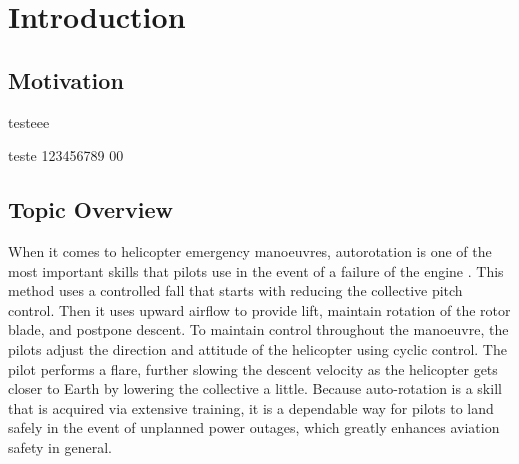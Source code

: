 
\chapter{Introduction}
\label{chapter:introduction}


\section{Motivation}
\label{section:motivation}

testeee

teste 123456789 00

\section{Topic Overview}
\label{section:topic_overview}

When it comes to helicopter emergency manoeuvres, autorotation is one of the most important skills that pilots use in the event of a failure of the engine \cite{federal_aviation_administration_helicopter_2021}. This method uses a controlled fall that starts with reducing the collective pitch control. Then it uses upward airflow to provide lift, maintain rotation of the rotor blade, and postpone descent. To maintain control throughout the manoeuvre, the pilots adjust the direction and attitude of the helicopter using cyclic control. The pilot performs a flare, further slowing the descent velocity as the helicopter gets closer to Earth by lowering the collective a little. Because auto-rotation is a skill that is acquired via extensive training, it is a dependable way for pilots to land safely in the event of unplanned power outages, which greatly enhances aviation safety in general.

